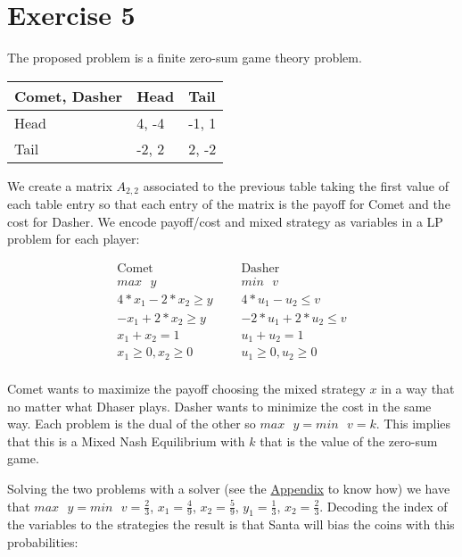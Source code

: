 \documentclass[paper=a4, fontsize=11pt]{scrartcl} %
\numberwithin{equation}{section} %
\numberwithin{figure}{section} %
\numberwithin{table}{section} %
\begin{document}
\section{Exercise 5}

The proposed problem is a finite zero-sum game theory problem.

\begin{center}
    \begin{tabular}{ | l | l | l | }
        \hline
        Comet, Dasher & Head & Tail \\ \hline
        Head & 4, -4 & -1, 1 \\ \hline
        Tail & -2, 2 & 2, -2 \\ \hline
    \end{tabular}
\end{center}

We create a matrix $A_{2,2}$ associated to the previous table taking the first value of each table entry so that each entry of the matrix is the payoff for Comet and the cost for Dasher.
We encode payoff/cost and mixed strategy as variables in a LP problem for each player:

\[
    \begin{array}{lll}
    \text{Comet} & \text{  } & \text{Dasher} \\
    max\text{ }y                & & min\text{ }v \\
    4*x_1 - 2*x_2 \geq y    & & 4*u_1 - u_2 \leq v \\
    -x_1 + 2*x_2 \geq y     & & -2*u_1 + 2*u_2 \leq v \\
    x_1 + x_2 = 1               & & u_1 + u_2 = 1 \\
    x_1 \geq 0, x_2 \geq 0      & & u_1 \geq 0, u_2 \geq 0 \\
    \end{array}
\]

Comet wants to maximize the payoff choosing the mixed strategy $x$ in a way that no matter what Dhaser plays. Dasher wants to minimize the cost in the same way.
Each problem is the dual of the other so $max\text{ }y = min\text{ }v = k$. This implies that this is a Mixed Nash Equilibrium with $k$ that is the value of the zero-sum game.

Solving the two problems with a solver (see the \hyperref[ex5app]{Appendix} to know how) we have that $max\text{ }y = min\text{ }v = \frac{2}{3}$, $x_1 = \frac{4}{9}$, $x_2 = \frac{5}{9}$, $y_1 = \frac{1}{3}$, $x_2 = \frac{2}{3}$.
Decoding the index of the variables to the strategies the result is that Santa will bias the coins with this probabilities:
\end{document}
